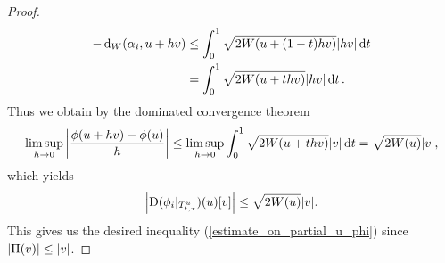 \begin{proof}
\begin{align*}
		-
		\geodesic_distance ( \alpha_{ i } , u + h v )
		& \leq
		\int_{ 0 }^{ 1 }
			\sqrt{ 2 W ( u + ( 1 - t ) h v ) }
			\abs{ h v }
		\dd{ t }
		\\
		& =
		\int_{ 0 }^{ 1 }
		\sqrt{ 2 W ( u + t h v ) }
		\abs{ h v }
		\dd{ t }
		.
	\end{align*}
	Thus we obtain by the dominated convergence theorem
	\begin{equation*}
		\limsup_{ h \to 0 }
			\abs{
			\frac{ \phi ( u + h v ) - \phi ( u ) }{ h }
			}
		\leq
		\limsup_{ h \to 0 }
			\int_{ 0 }^{ 1 }
				\sqrt{ 2 W ( u + t h v ) }
				\abs{ v }
			\dd{ t }
		= 
		\sqrt{ 2 W ( u ) } \abs{ v },
	\end{equation*}
	which yields
	\begin{equation*}
		\abs{ \mathrm{D}  ( \phi_{ i } |_{ T_{ t, x }^{ u } } ) ( u ) [ v ] }
		\leq
		\sqrt{ 2 W ( u ) } \abs{ v }.
	\end{equation*}
	This gives us the desired inequality (\ref{estimate_on_partial_u_phi}) 
	since $ \abs{ \Pi ( v ) } \leq \abs{ v } $.
	

\end{proof}
